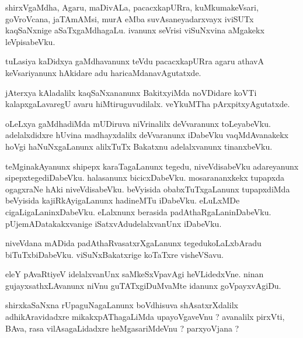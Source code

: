 \documentclass{article}
\begin{document}
\begin{mn}%
shirxVgaMdha, Agaru, maDivALa, pacacxkapURra, kuMkumakeVsari, goVroVcana, jaTAmAMsi, murA 
eMba suvAsaneyadarxvayx iviSUTx kaqSaNxnige aSaTxgaMdhagaLu. ivanunx seVrisi viSuNxvina 
aMgakekx leVpisabeVku.
\end{mn}

\begin{mn}%
tuLasiya kaDidxya gaMdhavanunx teVdu pacacxkapURra agaru athavA keVsariyanunx hAkidare adu 
haricaMdanavAgutatxde.
\end{mn}

\begin{mn}%
jAterxya kAladalilx kaqSaNxananunx BakitxyiMda noVDidare koVTi kalapxgaLavaregU avaru 
hiMtiruguvudilalx. veYkuMTha pArxpitxyAgutatxde.
\end{mn}

\begin{mn}%
oLeLxya gaMdhadiMda mUDiruva niVrinalilx deVvaranunx toLeyabeVku. adelalxdidxre hUvina 
madhayxdalilx deVvaranunx iDabeVku vaqMdAvanakekx hoVgi haNuNxgaLanunx alilxTuTx Bakatxnu 
adelalxvanunx tinanxbeVku.
\end{mn}

\begin{mn}%
teMginakAyanunx shipepx karaTagaLanunx tegedu, niveVdisabeVku adareyanunx 
sipepxtegediDabeVku. halasanunx bicicxDabeVku. mosarananxkekx tupapxda ogagxraNe hAki 
niveVdisabeVku. beVyisida obabxTuTxgaLanunx tupapxdiMda beVyisida kajiRkAyigaLanunx 
hadineMTu iDabeVku. eLuLxMDe cigaLigaLaninxDabeVku. eLalxnunx berasida 
padAthaRgaLaninDabeVku. pUjemADatakakxvanige iSatxvAdudelalxvanUnx iDabeVku.
\end{mn}

\begin{mn}%
niveVdana mADida padAthaRvasatxrXgaLanunx tegedukoLaLxbAradu biTuTxbiDabeVku. 
viSuNxBakatxrige koTaTxre visheVSavu.
\end{mn}

\begin{mn}%
eleY pAvaRtiyeV idelalxvanUnx saMkeSxVpavAgi heVLidedxVne. ninan gujayxsathxLAvanunx niVnu guTATxgiDuMvaMte idanunx goVpayxvAgiDu.
\end{mn}

\begin{mn}%
shirxkaSaNxna rUpaguNagaLanunx boVdhisuva shAsatxrXdalilx adhikAravidadxre 
mikakxpAThagaLiMda upayoVgaveVnu ? avanalilx pirxVti, BAva, rasa vilAsagaLidadxre 
heMgasariMdeVnu ? parxyoVjana ?
\end{mn}
\end{document}
